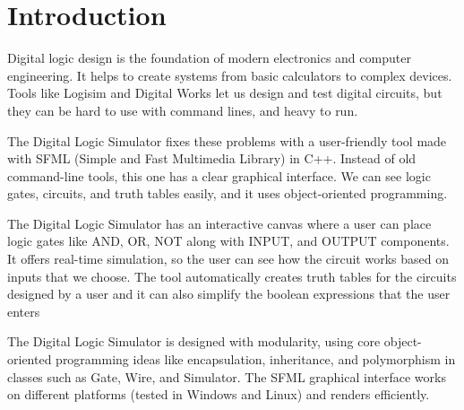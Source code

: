 \section{Introduction}
Digital logic design is the foundation of modern electronics and computer engineering. It helps to create systems from basic calculators to complex devices. Tools like Logisim and Digital Works let us design and test digital circuits, but they can be hard to use with command lines, and heavy to run.

\vspace{0.5cm}
The Digital Logic Simulator fixes these problems with a user-friendly tool made with SFML (Simple and Fast Multimedia Library) in C++. Instead of old command-line tools, this one has a clear graphical interface. We can see logic gates, circuits, and truth tables easily, and it uses object-oriented programming.

\vspace{0.5cm}
The Digital Logic Simulator has an interactive canvas where a user can place logic gates like AND, OR, NOT along with INPUT, and OUTPUT components. It offers real-time simulation, so the user can see how the circuit works based on inputs that we choose. The tool automatically creates truth tables for the circuits designed by a user and it can also simplify the boolean expressions that the user enters

\vspace{0.5cm}
The Digital Logic Simulator is designed with modularity, using core object-oriented programming ideas like encapsulation, inheritance, and polymorphism in classes such as Gate, Wire, and Simulator. The SFML graphical interface works on different platforms (tested in Windows and Linux) and renders efficiently.
\clearpage
